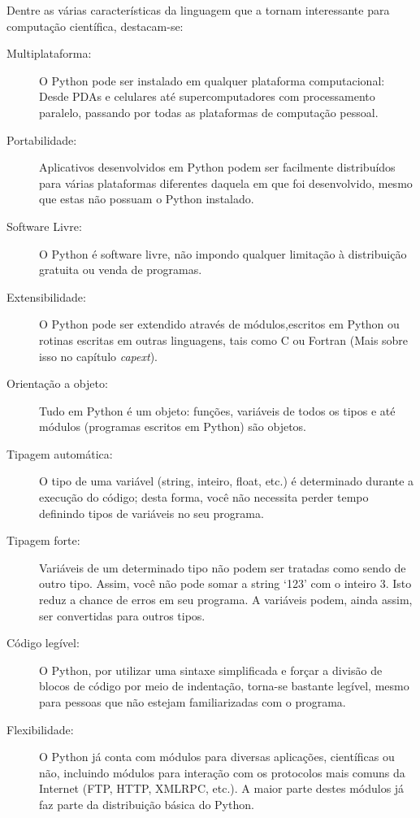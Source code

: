 \documentclass[a4paper,10pt,portuguese]{sphinxmanual}
\begin{document}
Dentre as várias características da linguagem que a tornam interessante para computação científica, destacam-se:
\begin{description}
\item[{Multiplataforma:}] \leavevmode
O Python pode ser instalado em qualquer plataforma computacional: Desde PDAs e celulares até supercomputadores com processamento paralelo, passando por todas as plataformas de computação pessoal.

\item[{Portabilidade:}] \leavevmode
Aplicativos desenvolvidos em Python podem ser facilmente distribuídos para várias plataformas diferentes daquela em que foi desenvolvido, mesmo que estas não possuam o Python instalado.

\item[{Software Livre:}] \leavevmode
O Python é software livre, não impondo qualquer limitação à distribuição gratuita ou venda de programas.

\item[{Extensibilidade:}] \leavevmode
O Python pode ser extendido através de módulos,escritos em Python ou rotinas escritas em outras linguagens, tais como C ou Fortran (Mais sobre isso no capítulo \emph{capext}).

\item[{Orientação a objeto:}] \leavevmode
Tudo em Python é um objeto: funções, variáveis de todos os tipos e até módulos (programas escritos em Python) são objetos.

\item[{Tipagem automática:}] \leavevmode
O tipo de uma variável (string, inteiro, float, etc.) é determinado durante a execução do código; desta forma, você não necessita perder tempo definindo tipos de variáveis no seu programa.

\item[{Tipagem forte:}] \leavevmode
Variáveis de um determinado tipo não podem ser tratadas como sendo de outro tipo. Assim, você não pode somar a string `123' com o inteiro 3. Isto reduz a chance de erros em seu programa. A variáveis podem, ainda assim, ser convertidas para outros tipos.

\item[{Código legível:}] \leavevmode
O Python, por utilizar uma sintaxe simplificada e forçar a divisão de blocos de código por meio de indentação, torna-se bastante legível, mesmo para pessoas que não estejam familiarizadas com o programa.

\item[{Flexibilidade:}] \leavevmode
O Python já conta com módulos para diversas aplicações, científicas ou não, incluindo módulos para interação com os protocolos mais comuns da Internet (FTP, HTTP, XMLRPC, etc.). A maior parte destes módulos já faz parte da distribuição básica do Python.


\end{description}
\end{document}
